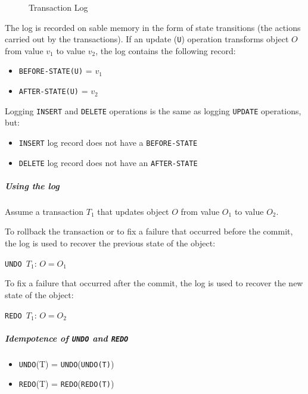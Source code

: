 \documentclass[english]{article}
\begin{document}
\begin{figure}[htbp]
  \centering
  \bigskip
  \caption{Transaction Log}
  \label{fig:transaction-log}
  \bigskip
\end{figure}

The log is recorded on sable memory in the form of state transitions (the actions carried out by the transactions).
If an update (\texttt{U}) operation transforms object \(O\) from value \(v_1\) to value \(v_2\), the log contains the following record:

\begin{itemize}
  \item \texttt{BEFORE-STATE(U)} = \(v_1\)
  \item \texttt{AFTER-STATE(U)} = \(v_2\)
\end{itemize}

Logging \texttt{INSERT} and \texttt{DELETE} operations is the same as logging \texttt{UPDATE} operations, but:

\begin{itemize}[label=\texttt{>}]
  \item \texttt{INSERT} log record does not have a \texttt{BEFORE-STATE}
  \item \texttt{DELETE} log record does not have an \texttt{AFTER-STATE}
\end{itemize}

\subparagraph*{Using the log}
Assume a transaction \(T_1\) that updates object \(O\) from value \(O_1\) to value \(O_2\).

To rollback the transaction or to fix a failure that occurred before the commit, the log is used to recover the previous state of the object:
\begin{center}
  \texttt{UNDO \(T_1\)}: \(O = O_1\)
\end{center}
To fix a failure that occurred after the commit, the log is used to recover the new state of the object:
\begin{center}
  \texttt{REDO \(T_1\)}: \(O = O_2\)
\end{center}

\subparagraph*{Idempotence of \texttt{UNDO} and \texttt{REDO}}

\begin{itemize}
  \item \texttt{UNDO}(T) = \texttt{UNDO}(\texttt{UNDO(T)})
  \item \texttt{REDO}(T) = \texttt{REDO}(\texttt{REDO(T)})
\end{itemize}
\end{document}
